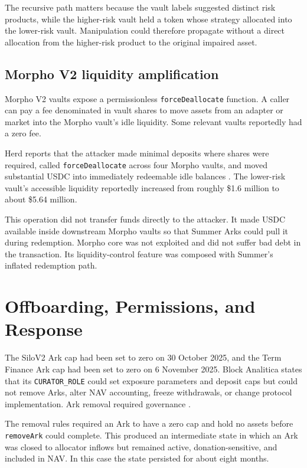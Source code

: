 \documentclass[11pt]{article}
\begin{document}
The recursive path matters because the vault labels suggested distinct risk products, while the higher-risk vault held a token whose strategy allocated into the lower-risk vault.  Manipulation could therefore propagate without a direct allocation from the higher-risk product to the original impaired asset.

\subsection{Morpho V2 liquidity amplification}

Morpho V2 vaults expose a permissionless \texttt{forceDeallocate} function.  A caller can pay a fee denominated in vault shares to move assets from an adapter or market into the Morpho vault's idle liquidity.  Some relevant vaults reportedly had a zero fee.

Herd reports that the attacker made minimal deposits where shares were required, called \texttt{forceDeallocate} across four Morpho vaults, and moved substantial USDC into immediately redeemable idle balances \cite{herd-analysis}.  The lower-risk vault's accessible liquidity reportedly increased from roughly \$1.6 million to about \$5.64 million.

This operation did not transfer funds directly to the attacker.  It made USDC available inside downstream Morpho vaults so that Summer Arks could pull it during redemption.  Morpho core was not exploited and did not suffer bad debt in the transaction.  Its liquidity-control feature was composed with Summer's inflated redemption path.

\section{Offboarding, Permissions, and Response}

The SiloV2 Ark cap had been set to zero on 30 October 2025, and the Term Finance Ark cap had been set to zero on 6 November 2025.  Block Analitica states that its \texttt{CURATOR\_ROLE} could set exposure parameters and deposit caps but could not remove Arks, alter NAV accounting, freeze withdrawals, or change protocol implementation.  Ark removal required governance \cite{ba-retrospective}.

The removal rules required an Ark to have a zero cap and hold no assets before \texttt{removeArk} could complete.  This produced an intermediate state in which an Ark was closed to allocator inflows but remained active, donation-sensitive, and included in NAV.  In this case the state persisted for about eight months.
\end{document}
